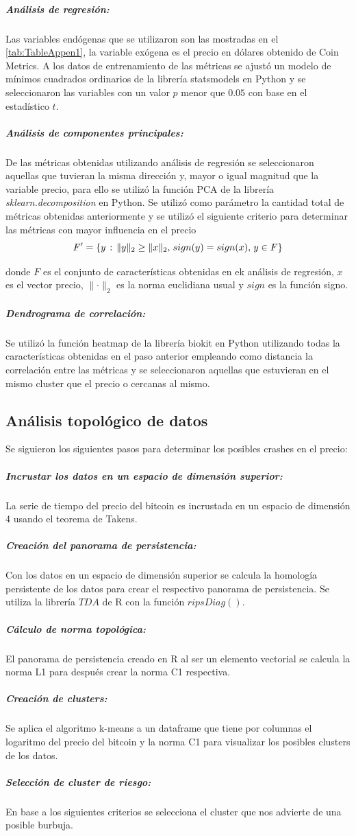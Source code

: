 \subparagraph{Análisis de regresión:}
\label{AR}
Las variables endógenas que se utilizaron son las mostradas en el \autoref{tab:TableAppen1}, la variable exógena es el precio en dólares obtenido de Coin Metrics. 
A los datos de entrenamiento de las métricas se ajustó un modelo de mínimos cuadrados ordinarios de la librería statsmodels en Python y se seleccionaron las variables con un valor $p$ menor que $0.05$ con base en el estadístico $t$.


\subparagraph{Análisis de componentes principales:}
\label{PCA}

De las métricas obtenidas utilizando análisis de regresión se seleccionaron aquellas que tuvieran la misma dirección y, mayor o igual magnitud que la variable precio, para ello se utilizó la función PCA de la librería \emph{sklearn.decomposition} en Python.
Se utilizó como parámetro la cantidad total de métricas obtenidas anteriormente y se utilizó el siguiente criterio para determinar las métricas con mayor influencia en el precio
\[ F^{\prime} = \{ y \hspace{0.5mm}:\hspace{0.5mm} \lVert y \rVert_2 \geq \lVert x \rVert_2,\hspace{0.5mm} sign(y) = sign(x),\hspace{0.5mm}y \in F\} \]

donde $F$ es el conjunto de características obtenidas en ek análisis de regresión, $x$ es el vector precio, $\lVert \cdot \rVert_2$ es la norma euclidiana usual y $sign$ es la función signo.

\subparagraph{Dendrograma de correlación:}
Se utilizó la función heatmap de la librería biokit en Python utilizando todas la características obtenidas en el paso anterior empleando como distancia la correlación entre las métricas y se seleccionaron aquellas que estuvieran en el mismo cluster que el precio o cercanas al mismo.

\subsection{Análisis topológico de datos}
Se siguieron los siguientes pasos para determinar los posibles crashes en el precio:

\subparagraph{Incrustar los datos en un espacio de dimensión superior:} La serie de tiempo del precio del bitcoin es incrustada en un espacio de dimensión 4 usando el teorema de Takens.
\subparagraph{Creación del panorama de persistencia:} Con los datos en un espacio de dimensión superior se calcula la homología persistente de los datos para crear el respectivo panorama de persistencia. Se utiliza la librería $TDA$ de R con la función $ripsDiag()$.
\subparagraph{Cálculo de norma topológica:} El panorama de persistencia creado en R al ser un elemento vectorial se calcula la norma L1 para después crear la norma C1 respectiva.
\subparagraph{Creación de clusters:} Se aplica el algoritmo k-means a un dataframe que tiene por columnas el logaritmo del precio del bitcoin y la norma C1 para visualizar los posibles clusters de los datos.
\subparagraph{Selección de cluster de riesgo:} En base a los siguientes criterios se selecciona el cluster que nos advierte de una posible burbuja. 

